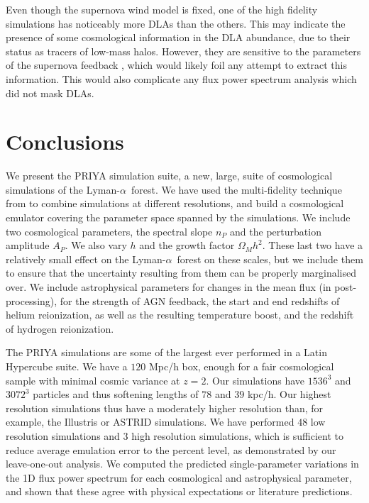 \documentclass[a4paper,11pt]{article}
\newcommand{\Lya}{Lyman-$\alpha$}
\begin{document}
Even though the supernova wind model is fixed, one of the high fidelity simulations has noticeably more DLAs than the others. This may indicate the presence of some cosmological information in the DLA abundance, due to their status as tracers of low-mass halos. However, they are sensitive to the parameters of the supernova feedback \cite{Bird:2014}, which would likely foil any attempt to extract this information. This would also complicate any flux power spectrum analysis which did not mask DLAs.

\section{Conclusions}
\label{sec:conclusions}

We present the PRIYA simulation suite, a new, large, suite of cosmological simulations of the \Lya~forest. We have used the multi-fidelity technique from \cite{Ho:2022, Fernandez:2022} to combine simulations at different resolutions, and build a cosmological emulator covering the parameter space spanned by the simulations. We include two cosmological parameters, the spectral slope $n_P$ and the perturbation amplitude $A_P$. We also vary $h$ and the growth factor $\Omega_M h^2$. These last two have a relatively small effect on the \Lya~forest on these scales, but we include them to ensure that the uncertainty resulting from them can be properly marginalised over. We include astrophysical parameters for changes in the mean flux (in post-processing), for the strength of AGN feedback, the start and end redshifts of helium reionization, as well as the resulting temperature boost, and the redshift of hydrogen reionization.

The PRIYA simulations are some of the largest ever performed in a Latin Hypercube suite. We have a $120$ Mpc/h box, enough for a fair cosmological sample with minimal cosmic variance at $z=2$. Our simulations have $1536^3$ and $3072^3$ particles and thus softening lengths of $78$ and $39$ kpc/h. Our highest resolution simulations thus have a moderately higher resolution than, for example, the Illustris \cite{Vogelsberger:2014} or ASTRID \cite{Bird:2022, Ni:2021} simulations. We have performed $48$ low resolution simulations and $3$ high resolution simulations, which is sufficient to reduce average emulation error to the percent level, as demonstrated by our leave-one-out analysis. We computed the predicted single-parameter variations in the 1D flux power spectrum for each cosmological and astrophysical parameter, and shown that these agree with physical expectations or literature predictions.
\end{document}
